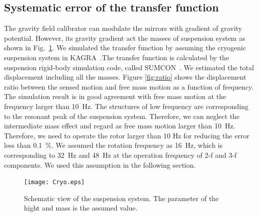 \documentclass[%
 reprint,
superscriptaddress,
 amsmath,amssymb,
 aps,
]{revtex4-1}
\begin{document}
\subsection{Systematic error of the transfer function}
The gravity field calibrator can modulate the mirrors with gradient of gravity potential. However, its gravity gradient act the masses of suspension system as shown in Fig.~\ref{fig:cryo}. We simulated the transfer function by assuming the cryogenic suspension system in KAGRA~\cite{0264-9381-34-22-225001}.The transfer function is calculated by the suspension rigid-body simulation code, called SUMCON~\cite{SUMCON}. We estimated the total displacement including all the masses. Figure \ref{fig:ratio} shows the displacement ratio between the sensed motion and free mass motion as a function of frequency. The simulation result is in good agreement with free mass motion at the frequency larger than 10~Hz. The structures of low frequency are corresponding to the resonant peak of the suspension system. Therefore, we can neglect the intermediate mass effect and regard as free mass motion larger than 10~Hz. 
Therefore, we need to operate the rotor larger than 10 Hz for reducing the error less than 0.1~\%.
We assumed the rotation frequency as 16~Hz, which is corresponding to 32~Hz and 48~Hz at the operation frequency of 2-f and 3-f components.  We used this assumption in the following section.


\begin{figure}
\begin{center}
\texttt{[image: Cryo.eps]}
\caption{Schematic view of the suspension system. The parameter of the hight and mass is the assumed value. }
\label{fig:cryo}
\end{center}
\end{figure}
\end{document}
